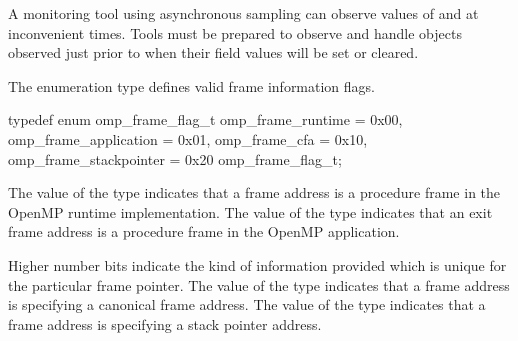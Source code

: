 %
%
%
%

\begin{note}
A monitoring tool using asynchronous sampling can observe values
of  and  at inconvenient times.
Tools must be prepared to observe and handle 
objects observed just prior to when their field values will be set or
cleared.
\end{note}


\summary
The  enumeration type defines valid frame information
flags.

\syntax
\begin{ccppspecific}
\begin{ompSyntax}
typedef enum omp_frame_flag_t {
  omp_frame_runtime        = 0x00,
  omp_frame_application    = 0x01,
  omp_frame_cfa            = 0x10,
  omp_frame_stackpointer   = 0x20
} omp_frame_flag_t; 
\end{ompSyntax}
\end{ccppspecific}

\descr
The value  of the  type
indicates that a frame address is a procedure frame in the OpenMP
runtime implementation.
The value  of the  type
indicates that an exit frame address is a procedure frame in the OpenMP
application.

Higher number bits indicate the kind of information provided which is unique
for the particular frame pointer.
The value  of the  type
indicates that a frame address is specifying a canonical frame address.
The value  of the  type
indicates that a frame address is specifying a stack pointer address.
